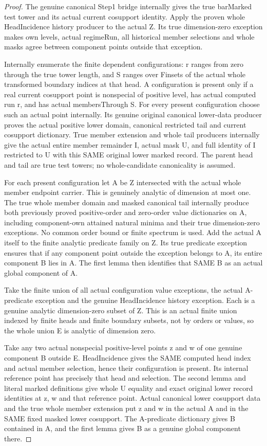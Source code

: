 \begin{proof}
The genuine canonical Step1 bridge internally gives the true barMarked test
tower and its actual current cosupport identity. Apply the proven whole
HeadIncidence history producer to the actual Z. Its true dimension-zero
exception makes own levels, actual regimeRun, all historical member selections
and whole masks agree between component points outside that exception.

Internally enumerate the finite dependent configurations: r ranges from zero
through the true tower length, and S ranges over Finsets of the actual whole
transformed boundary indices at that head. A configuration is present only
if a real current cosupport point is nonspecial of positive level, has actual
computed run r, and has actual membersThrough S. For every present
configuration choose such an actual point internally. Its genuine original
canonical lower-data producer proves the actual positive lower domain,
canonical restricted tail and current cosupport dictionary. True member
extension and whole tail producers internally give the actual entire
member remainder I, actual mask U, and full identity of I restricted to U
with this SAME original lower marked record. The parent head and tail are
true test towers; no whole-candidate canonicality is assumed.

For each present configuration let A be Z intersected with the actual whole
member endpoint carrier. This is genuinely analytic of dimension at most
one. The true whole member domain and masked canonical tail internally
produce both previously proved positive-order and zero-order value dictionaries
on A, including component-own attained natural minima and their true
dimension-zero exceptions. No common order bound or finite spectrum is
used. Add the actual A itself to the finite analytic predicate family on Z.
Its true predicate exception ensures that if any component point outside
the exception belongs to A, its entire component B lies in A. The first
lemma then identifies that SAME B as an actual global component of A.

Take the finite union of all actual configuration value exceptions, the
actual A-predicate exception and the genuine HeadIncidence history exception.
Each is a genuine analytic dimension-zero subset of Z. This is an actual
finite union indexed by finite heads and finite boundary subsets, not by
orders or values, so the whole union E is analytic of dimension zero.

Take any two actual nonspecial positive-level points z and w of one genuine
component B outside E. HeadIncidence gives the SAME computed head index and
actual member selection, hence their configuration is present. Its internal
reference point has precisely that head and selection. The second lemma and
literal marked definitions give whole U equality and exact original lower
record identities at z, w and that reference point. Actual canonical lower
cosupport data and the true whole member extension put z and w in the
actual A and in the SAME fixed masked lower cosupport. The A-predicate
dictionary gives B contained in A, and the first lemma gives B as a genuine
global component there.


\end{proof}
